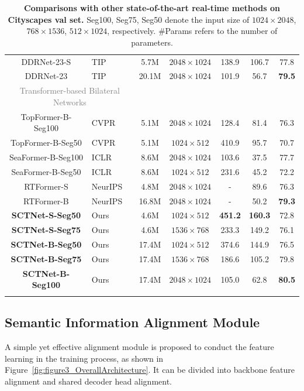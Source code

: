 \documentclass[letterpaper]{article} %
\begin{document}
\begin{table}[t]
\begin{tabular}{c l|c|c|c|c|c}
    DDRNet-23-S &TIP~\citeyear{pan2022deep} &5.7M &$2048 \times 1024$ &138.9 &106.7 &77.8 \\
    DDRNet-23 &TIP~\citeyear{pan2022deep} &20.1M &$2048 \times 1024$ &101.9 &56.7 &\textbf{79.5} \\
    \hline
    \multicolumn{2}{c|}{\textcolor{gray}{Transformer-based Bilateral Networks}} & &  & & &\\
    TopFormer-B-Seg100 &CVPR~\citeyear{zhang2022topformer}    &5.1M &$2048 \times 1024$ &128.4 &81.4 &76.3 \\
    TopFormer-B-Seg50  &CVPR~\citeyear{zhang2022topformer}    &5.1M &$1024 \times 512$ &410.9 &95.7 &70.7\\
    SeaFormer-B-Seg100 &ICLR~\citeyear{wan2023seaformer}    &8.6M &$2048 \times 1024$ &103.6 &37.5 &77.7 \\
    SeaFormer-B-Seg50 &ICLR~\citeyear{wan2023seaformer} &8.6M &$1024 \times 512$ &231.6 &45.2 &72.2 \\
    RTFormer-S &NeurIPS~\citeyear{wang2022rtformer}    &4.8M &$2048 \times 1024$ &- &89.6 &76.3 \\
    RTFormer-B &NeurIPS~\citeyear{wang2022rtformer}    &16.8M &$2048 \times 1024$ &- &50.2 &\textbf{79.3} \\
    \hline
    \textbf{SCTNet-S-Seg50}  &Ours &4.6M &$1024 \times 512$ &\textbf{451.2} &\textbf{160.3} &72.8\\
    \textbf{SCTNet-S-Seg75} &Ours &4.6M &$1536 \times 768$ &233.3 &149.2 &76.1 \\
    \textbf{SCTNet-B-Seg50}  &Ours &17.4M &$1024 \times 512$ &374.6 &144.9 &76.5 \\
    \textbf{SCTNet-B-Seg75}  &Ours &17.4M &$1536 \times 768$ &186.6 &105.2 &79.8\\
    \textbf{SCTNet-B-Seg100} &Ours &17.4M &$2048 \times 1024$ &105.0  &62.8 &\textbf{80.5} \\
    \Xhline{1pt}
  \end{tabular}
\caption{\textbf{Comparisons with other state-of-the-art real-time methods on Cityscapes val set.} Seg100, Seg75, Seg50 denote the input size of $1024\times2048$, $768\times1536$, $512\times1024$, respectively. \#Params refers to the number of parameters.
}
  \label{tab:sample-tableSOTA}
\end{table}


\subsection{Semantic Information Alignment Module}
A simple yet effective alignment module is proposed to conduct the feature learning in the training process, as shown in Figure~\ref{fig:figure3_OverallArchitecture}. It can be divided into backbone feature alignment and shared decoder head alignment.
\end{document}
